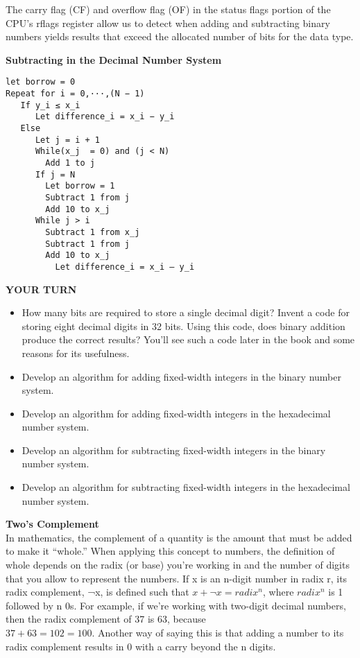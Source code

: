 \documentclass[12pt]{extarticle}
\begin{document}
The carry flag (CF) and overflow flag (OF) in the status flags portion of the CPU’s
rflags register allow us to detect when adding and subtracting binary numbers yields
results that exceed the allocated number of bits for the data type.

\textbf{Subtracting in the Decimal Number System}
\begin{lstlisting}
let borrow = 0
Repeat for i = 0,···,(N − 1)
   If y_i ≤ x_i
      Let difference_i = x_i − y_i
   Else
      Let j = i + 1
      While(x_j  = 0) and (j < N)
        Add 1 to j
      If j = N
        Let borrow = 1
        Subtract 1 from j
        Add 10 to x_j
      While j > i 
        Subtract 1 from x_j
        Subtract 1 from j
        Add 10 to x_j
          Let difference_i = x_i – y_i
\end{lstlisting}

\textbf{YOUR TURN}
\begin{itemize}
  \item How many bits are required to store a single decimal digit? Invent a code for 
    storing eight decimal digits in 32 bits. Using this code, does binary addition produce
    the correct results? You’ll see such a code later in the book and some reasons for 
    its usefulness.
  \item Develop an algorithm for adding fixed-width integers in the binary number system.
  \item Develop an algorithm for adding fixed-width integers in the hexadecimal number system.
  \item Develop an algorithm for subtracting fixed-width integers in the binary number system.
  \item Develop an algorithm for subtracting fixed-width integers in the hexadecimal number system.
\end{itemize}

\vspace{18pt}
\textbf{Two’s Complement}\\
In mathematics, the complement of a quantity is the amount that must be added to make it 
“whole.” When applying this concept to numbers, the definition of whole depends on the 
radix (or base) you’re working in and the number of digits that you allow to represent 
the numbers. If x is an n-digit number in radix r, its radix complement, ¬x, is defined
such that $x + \lnot x = radix^n$, where $radix^n$ is 1 followed by n 0s. For example, if we’re
working with two-digit decimal numbers, then the radix complement of 37 is 63, because \\
$37 + 63 = 102 = 100$. Another way of saying this is that adding a number to its radix 
complement results in 0 with a carry beyond the n digits.\\
\end{document}
